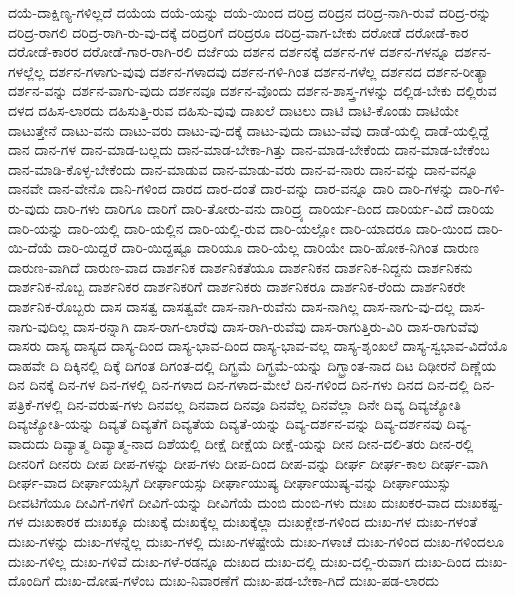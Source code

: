 {ದಯೆ-ದಾಕ್ಷಿಣ್ಯ-ಗಳಿಲ್ಲದೆ
ದಯೆಯ
ದಯೆ-ಯನ್ನು
ದಯೆ-ಯಿಂದ
ದರಿದ್ರ
ದರಿದ್ರನ
ದರಿದ್ರ-ನಾಗಿ-ರುವೆ
ದರಿದ್ರ-ರನ್ನು
ದರಿದ್ರ-ರಾಗಲಿ
ದರಿದ್ರ-ರಾಗಿ-ರು-ವು-ದಕ್ಕೆ
ದರಿದ್ರರಿಗೆ
ದರಿದ್ರರೂ
ದರಿದ್ರ-ವಾಗ-ಬೇಕು
ದರೋಡೆ
ದರೋಡೆ-ಕಾರ
ದರೋಡೆ-ಕಾರರ
ದರೋಡೆ-ಗಾರ-ರಾಗಿ-ರಲಿ
ದರ್ಜೆಯ
ದರ್ಶನ
ದರ್ಶನಕ್ಕೆ
ದರ್ಶನ-ಗಳ
ದರ್ಶನ-ಗಳನ್ನೂ
ದರ್ಶನ-ಗಳಲ್ಲೆಲ್ಲ
ದರ್ಶನ-ಗಳಾಗು-ವುವು
ದರ್ಶನ-ಗಳಾದವು
ದರ್ಶನ-ಗಳಿ-ಗಿಂತ
ದರ್ಶನ-ಗಳೆಲ್ಲ
ದರ್ಶನದ
ದರ್ಶನ-ರೀತ್ಯಾ
ದರ್ಶನ-ವನ್ನು
ದರ್ಶನ-ವಾಗು-ವುದು
ದರ್ಶನವೂ
ದರ್ಶನ-ವೊಂದು
ದರ್ಶನ-ಶಾಸ್ತ್ರ-ಗಳನ್ನು
ದಲ್ಲಿಡ-ಬೇಕು
ದಲ್ಲಿರುವ
ದಳದ
ದಹಿಸ-ಲಾರದು
ದಹಿಸುತ್ತಿ-ರುವ
ದಹಿಸು-ವುವು
ದಾಖಲೆ
ದಾಟಲು
ದಾಟಿ
ದಾಟಿ-ಕೊಂಡು
ದಾಟಿಯೇ
ದಾಟುತ್ತೇನೆ
ದಾಟು-ವನು
ದಾಟು-ವರು
ದಾಟು-ವು-ದಕ್ಕೆ
ದಾಟು-ವುದು
ದಾಟು-ವೆವು
ದಾಡೆ-ಯಲ್ಲಿ
ದಾಡೆ-ಯಲ್ಲಿದ್ದೆ
ದಾನ
ದಾನ-ಗಳ
ದಾನ-ಮಾಡ-ಬಲ್ಲದು
ದಾನ-ಮಾಡ-ಬೇಕಾ-ಗಿತ್ತು
ದಾನ-ಮಾಡ-ಬೇಕೆಂದು
ದಾನ-ಮಾಡ-ಬೇಕೆಂಬ
ದಾನ-ಮಾಡಿ-ಕೊಳ್ಳ-ಬೇಕೆಂದು
ದಾನ-ಮಾಡುವ
ದಾನ-ಮಾಡು-ವರು
ದಾನ-ವ-ನಾರು
ದಾನ-ವನ್ನು
ದಾನ-ವನ್ನೂ
ದಾನವೇ
ದಾನ-ವೇನೊ
ದಾನಿ-ಗಳಿಂದ
ದಾರದ
ದಾರ-ದಂತೆ
ದಾರ-ವನ್ನು
ದಾರ-ವನ್ನೂ
ದಾರಿ
ದಾರಿ-ಗಳನ್ನು
ದಾರಿ-ಗಳಿ-ರು-ವುದು
ದಾರಿ-ಗಳು
ದಾರಿಗೂ
ದಾರಿಗೆ
ದಾರಿ-ತೋರು-ವನು
ದಾರಿದ್ರ್ಯ
ದಾರಿರ್ಯ-ದಿಂದ
ದಾರಿರ್ಯ-ವಿದೆ
ದಾರಿಯ
ದಾರಿ-ಯನ್ನು
ದಾರಿ-ಯಲ್ಲಿ
ದಾರಿ-ಯಲ್ಲಿನ
ದಾರಿ-ಯಲ್ಲಿ-ರುವ
ದಾರಿ-ಯಲ್ಲೋ
ದಾರಿ-ಯಾದರೂ
ದಾರಿ-ಯಿಂದ
ದಾರಿ-ಯಿ-ದೆಯೆ
ದಾರಿ-ಯಿದ್ದರೆ
ದಾರಿ-ಯಿದ್ದಷ್ಟೂ
ದಾರಿಯೂ
ದಾರಿ-ಯೆಲ್ಲ
ದಾರಿಯೇ
ದಾರಿ-ಹೋಕ-ನಿಗಿಂತ
ದಾರುಣ
ದಾರುಣ-ವಾಗಿದೆ
ದಾರುಣ-ವಾದ
ದಾರ್ಶನಿಕ
ದಾರ್ಶನಿಕತೆಯೂ
ದಾರ್ಶನಿಕನ
ದಾರ್ಶನಿಕ-ನಿದ್ದನು
ದಾರ್ಶನಿಕನು
ದಾರ್ಶನಿಕ-ನೊಬ್ಬ
ದಾರ್ಶನಿಕರ
ದಾರ್ಶನಿಕರಿಗೆ
ದಾರ್ಶನಿಕರು
ದಾರ್ಶನಿಕರೂ
ದಾರ್ಶನಿಕ-ರೆಂದು
ದಾರ್ಶನಿಕರೇ
ದಾರ್ಶನಿಕ-ರೊಬ್ಬರು
ದಾಸ
ದಾಸತ್ವ
ದಾಸತ್ವವೇ
ದಾಸ-ನಾಗಿ-ರುವೆನು
ದಾಸ-ನಾಗಿಲ್ಲ
ದಾಸ-ನಾಗು-ವು-ದಲ್ಲ
ದಾಸ-ನಾಗು-ವುದಿಲ್ಲ
ದಾಸ-ರನ್ನಾಗಿ
ದಾಸ-ರಾಗ-ಲಾರೆವು
ದಾಸ-ರಾಗಿ-ರುವೆವು
ದಾಸ-ರಾಗುತ್ತಿರು-ವಿರಿ
ದಾಸ-ರಾಗುವೆವು
ದಾಸರು
ದಾಸ್ಯ
ದಾಸ್ಯದ
ದಾಸ್ಯ-ದಿಂದ
ದಾಸ್ಯ-ಭಾವ-ದಿಂದ
ದಾಸ್ಯ-ಭಾವ-ವಲ್ಲ
ದಾಸ್ಯ-ಶೃಂಖಲೆ
ದಾಸ್ಯ-ಸ್ವಭಾವ-ವಿದೆಯೊ
ದಾಹವೇ
ದಿ
ದಿಕ್ಕಿನಲ್ಲಿ
ದಿಕ್ಕೆ
ದಿಗಂತ
ದಿಗಂತ-ದಲ್ಲಿ
ದಿಗ್ಭ್ರಮೆ
ದಿಗ್ಭ್ರಮೆ-ಯನ್ನು
ದಿಗ್ಭ್ರಾಂತ-ನಾದ
ದಿಟ
ದಿಢೀರನೆ
ದಿಣ್ಣೆಯ
ದಿನ
ದಿನಕ್ಕೆ
ದಿನ-ಗಳ
ದಿನ-ಗಳಲ್ಲಿ
ದಿನ-ಗಳಾದ
ದಿನ-ಗಳಾದ-ಮೇಲೆ
ದಿನ-ಗಳಿಂದ
ದಿನ-ಗಳು
ದಿನದ
ದಿನ-ದಲ್ಲಿ
ದಿನ-ಪತ್ರಿಕೆ-ಗಳಲ್ಲಿ
ದಿನ-ವರುಷ-ಗಳು
ದಿನವಲ್ಲ
ದಿನವಾದ
ದಿನವೂ
ದಿನವೆಲ್ಲ
ದಿನವೆಲ್ಲಾ
ದಿನೇ
ದಿವ್ಯ
ದಿವ್ಯಜ್ಯೋತಿ
ದಿವ್ಯಜ್ಯೋತಿ-ಯನ್ನು
ದಿವ್ಯತೆ
ದಿವ್ಯತೆಗೆ
ದಿವ್ಯತೆಯ
ದಿವ್ಯತೆ-ಯನ್ನು
ದಿವ್ಯ-ದರ್ಶನ-ವನ್ನು
ದಿವ್ಯ-ದರ್ಶನವು
ದಿವ್ಯ-ವಾದುದು
ದಿವ್ಯಾತ್ಮ
ದಿವ್ಯಾತ್ಮ-ನಾದ
ದಿಶೆಯಲ್ಲಿ
ದೀಕ್ಷೆ
ದೀಕ್ಷೆಯ
ದೀಕ್ಷೆ-ಯನ್ನು
ದೀನ
ದೀನ-ದಲಿ-ತರು
ದೀನ-ರಲ್ಲಿ
ದೀನರಿಗೆ
ದೀನರು
ದೀಪ
ದೀಪ-ಗಳನ್ನು
ದೀಪ-ಗಳು
ದೀಪ-ದಿಂದ
ದೀಪ-ವನ್ನು
ದೀರ್ಘ
ದೀರ್ಘ-ಕಾಲ
ದೀರ್ಘ-ವಾಗಿ
ದೀರ್ಘ-ವಾದ
ದೀರ್ಘಾಯಸ್ಸಿಗೆ
ದೀರ್ಘಾಯಸ್ಸು
ದೀರ್ಘಾಯುಷ್ಯ
ದೀರ್ಘಾಯುಷ್ಯ-ವನ್ನು
ದೀರ್ಘಾಯುಸ್ಸು
ದೀವಟಿಗೆಯೂ
ದೀವಿಗೆ-ಗಳಿಗೆ
ದೀವಿಗೆ-ಯನ್ನು
ದೀವಿಗೆಯೆ
ದುಂಬಿ
ದುಂಬಿ-ಗಳು
ದುಃಖ
ದುಃಖಕರ-ವಾದ
ದುಃಖಕಷ್ಟ-ಗಳ
ದುಃಖಕಾರಕ
ದುಃಖಕ್ಕೂ
ದುಃಖಕ್ಕೆ
ದುಃಖಕ್ಕೆಲ್ಲ
ದುಃಖಕ್ಕೆಲ್ಲಾ
ದುಃಖಕ್ಲೇಶ-ಗಳಿಂದ
ದುಃಖ-ಗಳ
ದುಃಖ-ಗಳಂತೆ
ದುಃಖ-ಗಳನ್ನು
ದುಃಖ-ಗಳನ್ನೆಲ್ಲ
ದುಃಖ-ಗಳಲ್ಲಿ
ದುಃಖ-ಗಳಷ್ಟೇಯೆ
ದುಃಖ-ಗಳಾಚೆ
ದುಃಖ-ಗಳಿಂದ
ದುಃಖ-ಗಳಿಂದಲೂ
ದುಃಖ-ಗಳಿಲ್ಲ
ದುಃಖ-ಗಳಿವೆ
ದುಃಖ-ಗಳೆ-ರಡನ್ನೂ
ದುಃಖದ
ದುಃಖ-ದಲ್ಲಿ
ದುಃಖ-ದಲ್ಲಿ-ರುವಾಗ
ದುಃಖ-ದಿಂದ
ದುಃಖ-ದೊಂದಿಗೆ
ದುಃಖ-ದೋಷ-ಗಳೆಂಬ
ದುಃಖ-ನಿವಾರಣೆಗೆ
ದುಃಖ-ಪಡ-ಬೇಕಾ-ಗಿದೆ
ದುಃಖ-ಪಡ-ಲಾರದು
}

